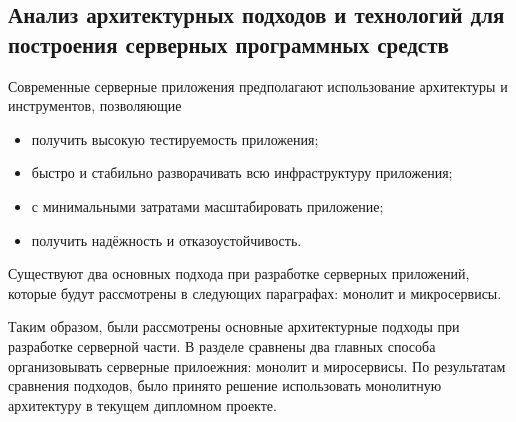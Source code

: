 \subsection{Анализ архитектурных подходов и технологий для построения серверных программных средств}
\label{sec:analysis:research:backArch}

Современные серверные приложения предполагают использование архитектуры и инструментов, позволяющие

\begin{itemize}
\item получить высокую тестируемость приложения;
\item быстро и стабильно разворачивать всю инфраструктуру приложения;
\item с минимальными затратами масштабировать приложение;
\item получить надёжность и отказоустойчивость.
\end{itemize}

Существуют два основных подхода при разработке серверных приложений, которые будут рассмотрены в следующих параграфах: монолит и микросервисы.




Таким образом, были рассмотрены основные архитектурные подходы при разработке серверной части. В разделе сравнены два главных способа организовывать серверные прилоежния: монолит и миросервисы. По результатам сравнения подходов, было принято решение использовать монолитную архитектуру в текущем дипломном проекте.